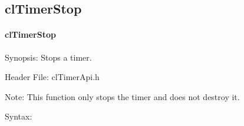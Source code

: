\begin{flushleft}
\newpage


\subsection{clTimerStop}
\hypertarget{pagetmr107}{}\paragraph{cl\-Timer\-Stop}\label{pagetmr107}
\begin{Desc}
\item[Synopsis:]Stops a timer.\end{Desc}
\begin{Desc}
\item[Header File:]clTimerApi.h\end{Desc}
\begin{Desc}
\item[Note:]This function only stops the timer and does not destroy it.\end{Desc}
\begin{Desc}
\item[Syntax:]


\end{Desc}
\end{flushleft}
